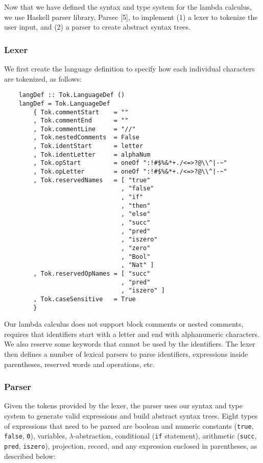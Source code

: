 \documentclass[fleqn, 11pt]{article}
\begin{document}
Now that we have defined the syntax and type system for the lambda calculus, we use Haskell parser library, Parsec [5], to implement (1) a lexer 
to tokenize the user input, and (2) a parser to create abstract syntax trees.

\subsubsection{Lexer}

We first create the language definition to specify how each individual characters are tokenized, as follows:

\begin{Verbatim}
    langDef :: Tok.LanguageDef ()
    langDef = Tok.LanguageDef
        { Tok.commentStart    = "" 
        , Tok.commentEnd      = ""
        , Tok.commentLine     = "//"
        , Tok.nestedComments  = False
        , Tok.identStart      = letter 
        , Tok.identLetter     = alphaNum 
        , Tok.opStart         = oneOf ":!#$%&*+./<=>?@\\^|-~"
        , Tok.opLetter        = oneOf ":!#$%&*+./<=>?@\\^|-~"
        , Tok.reservedNames   = [ "true"
                                , "false"
                                , "if"
                                , "then"
                                , "else"
                                , "succ"
                                , "pred"
                                , "iszero"
                                , "zero"
                                , "Bool"
                                , "Nat" ]
        , Tok.reservedOpNames = [ "succ"
                                , "pred"
                                , "iszero" ]
        , Tok.caseSensitive   = True
        }
\end{Verbatim}

Our lambda calculus does not support block comments or nested comments, requires that identifiers start with a letter and end with 
alphanumeric characters. We also reserve some keywords that cannot be used by the identifiers. The lexer then defines a number of 
lexical parsers to parse identifiers, expressions inside parentheses, reserved words and operations, etc.

\subsubsection{Parser}

Given the tokens provided by the lexer, the parser uses our syntax and type system to generate valid expressions and build abstract 
syntax trees. Eight types of expressions that need to be parsed are boolean and numeric constants (\texttt{true}, \texttt{false}, \texttt{0}), 
variables, $\lambda$-abstraction, conditional (\texttt{if} statement), arithmetic (\texttt{succ}, \texttt{pred}, \texttt{iszero}), 
projection, record, and any expression enclosed in parentheses, as described below:
\end{document}
